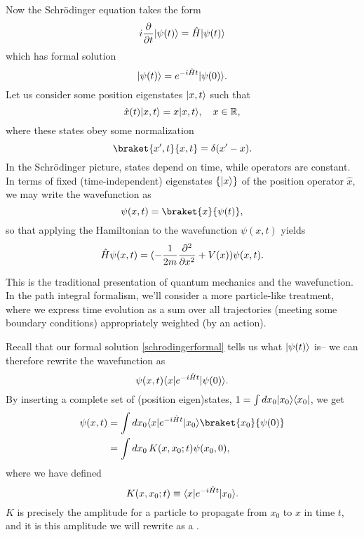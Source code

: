 Now the Schr\"odinger equation takes the form
\begin{equation}
    i\frac{\partial }{\partial t}\lvert\psi(t)\rangle=\hat H \lvert\psi(t)\rangle
\end{equation}
which has formal solution
\begin{equation}\label{schrodingerformal}
    \lvert\psi(t)\rangle=e^{-i\hat H t}\lvert\psi(0)\rangle.
\end{equation}
Let us consider some position eigenstates $\lvert x,t\rangle$ such that
\begin{equation*}
    \hat x(t)\lvert x,t\rangle=x \lvert x,t\rangle,\quad x\in \mathbb{R},
\end{equation*}
where these states obey some normalization
\begin{equation*}
    \braket{x',t}{x,t}=\delta(x'-x).
\end{equation*}
In the Schr\"odinger picture, states depend on time, while operators are constant. In terms of fixed (time-independent) eigenstates $\{\lvert x\rangle\}$ of the position operator $\hat x$, we may write the wavefunction as
\begin{equation}
    \psi(x,t)=\braket{x}{\psi(t)},
\end{equation}
so that applying the Hamiltonian to the wavefunction $\psi(x,t)$ yields
\begin{equation}
    \hat H \psi(x,t)=(-\frac{1}{2m}\frac{\partial^2}{\partial x^2} + V(x))\psi(x,t).
\end{equation}

This is the traditional presentation of quantum mechanics and the wavefunction. In the path integral formalism, we'll consider a more particle-like treatment, where we express time evolution as a sum over all trajectories (meeting some boundary conditions) appropriately weighted (by an action).

Recall that our formal solution \ref{schrodingerformal} tells us what $\lvert\psi(t)\rangle$ is-- we can therefore rewrite the wavefunction as
\begin{equation}
    \psi(x,t)\langle x\rvert e^{-i\hat Ht} \lvert\psi(0)\rangle.
\end{equation}
By inserting a complete set of (position eigen)states, $1=\int dx_0 \lvert x_0\rangle\langle x_0\rvert$, we get
\begin{align*}
    \psi(x,t) &=\int dx_0 \bra{x} e^{-i\hat Ht}\ket{x_0} \braket{x_0}{\psi(0)}\\
        &= \int dx_0\, K(x,x_0; t) \psi(x_0,0),
\end{align*}
where we have defined 
\begin{equation}
    K(x,x_0;t) \equiv \langle x\rvert e^{-i\hat Ht}\lvert x_0\rangle.
\end{equation}
$K$ is precisely the amplitude for a particle to propagate from $x_0$ to $x$ in time $t$, and it is this amplitude we will rewrite as a .

